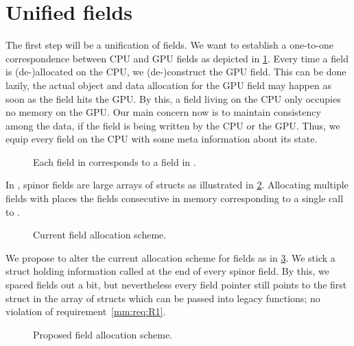 \section{Unified fields}
\label{sec:mm:unified:fields}

The first step will be a unification of fields.
We want to establish a one-to-one correspondence between CPU and GPU fields as depicted in \cref{fig:mm:field0:correspondence}.
Every time a field is (de-)allocated on the CPU, we (de-)construct the GPU field.
This can be done lazily, \ie the actual object and data allocation for the GPU field may happen as soon as the field hits the GPU.
By this, a field living on the CPU only occupies no memory on the GPU.
Our main concern now is to maintain consistency among the data, if the field is being written by the CPU or the GPU.
Thus, we equip every field on the CPU with some meta information about its state.

\begin{figure}
  
  \caption{Each field in \openqxd corresponds to a field in \quda.}
  \label{fig:mm:field0:correspondence}
\end{figure}

In \openqxd, spinor fields are large arrays of structs as illustrated in \cref{fig:mm:field1:current_scheme}.
Allocating multiple fields with  places the fields consecutive in memory corresponding to a single call to .

\begin{figure}
  
  \caption{Current field allocation scheme.}
  \label{fig:mm:field1:current_scheme}
\end{figure}

We propose to alter the current allocation scheme for fields as in \cref{fig:mm:field2:proposed_scheme}.
We stick a struct holding information called  at the end of every spinor field.
By this, we spaced fields out a bit, but nevertheless every field pointer still points to the first struct in the array of structs which can be passed into legacy functions; no violation of requirement~\ref{mm:req:R1}.

\begin{figure}
  
  \caption{Proposed field allocation scheme.}
  \label{fig:mm:field2:proposed_scheme}
\end{figure}

